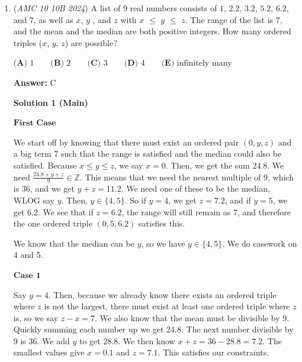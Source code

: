 \begin{enumerate}
 Notice how the two solution spaces are perfectly aligned? We can combine the inequalities! Our entire solution space is now $18 \leq x^2 + y^2 \leq 32$, which describes an annulus with outer area $32\pi$ and inner area $18\pi$.

 Our solution area is $32\pi - 18\pi = 14\pi$ and our total area (from the first graph) is $4*\frac{8\cdot8}{2} = 128$. The final answer is $\frac{14\pi}{128} = \frac{7\pi}{64} \Longrightarrow \boxed{\textbf{(B)}\ 71}$.

 


	\item (\textit{AMC 10 10B 2024}) A list of $9$ real numbers consists of $1$, $2.2$, $3.2$, $5.2$, $6.2$, and $7$, as well as $x$, $y$ , and $z$ with $x$ $\le$ $y$ $\le$ $z$. The range of the list is $7$, and the mean and the median are both positive integers. How many ordered triples ($x$, $y$, $z$) are possible?


 $\textbf{(A) } 1 \qquad \textbf{(B) } 2 \qquad \textbf{(C) } 3 \qquad \textbf{(D) } 4 \qquad \textbf{(E) } \text{infinitely many}$

 \textbf{Answer: }C



\textbf{Solution 1 (Main)}

$\textbf{First Case}$

 We start off by knowing that there must exist an ordered pair \( (0,y,z) \) and a big term 7 such that the range is satisfied and the median could also be satisfied. Because \( x \le y \le z \), we say \( x=0 \). Then, we get the sum 24.8. We need \( \frac{24.8 +y +z}{9} \in \mathbb{Z} \). This means that we need the nearest multiple of 9, which is 36, and we get \( y+z = 11.2 \). We need one of these to be the median, WLOG say \( y \). Then, \( y \in \{4,5\} \). So if \( y=4 \), we get \( z=7.2 \), and if \( y=5 \), we get 6.2. We see that if \( z=6.2 \), the range will still remain as 7, and therefore the one ordered triple \( (0,5,6.2) \) satisfies this.

 We know that the median can be \( y \), so we have \( y \in \{4,5\} \). We do casework on 4 and 5.

 $\textbf{Case 1}$

 Say \( y=4 \). Then, because we already know there exists an ordered triple where \( z \) is not the largest, there must exist at least one ordered triple where \( z \) is, so we say \( z-x=7 \). We also know that the mean must be divisible by 9. Quickly summing each number up we get 24.8. The next number divisible by 9 is 36. We add \( y \) to get 28.8. We then know \( x+z=36-28.8=7.2 \). The smallest values give \( x=0.1 \) and \( z=7.1 \). This satisfies our constraints.


\end{enumerate}
